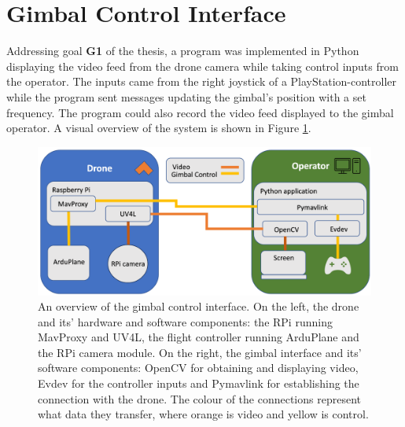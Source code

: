 \documentclass[nofilelist]{cslthse-msc}
\begin{document}
\section{Gimbal Control Interface}
Addressing goal \textbf{G1} of the thesis, a program was implemented in Python displaying the video feed from the drone camera while taking control inputs from the operator. The inputs came from the right joystick of a PlayStation-controller while the program sent messages updating the gimbal's position with a set frequency. The program could also record the video feed displayed to the gimbal operator. A visual overview of the system is shown in Figure \ref{fig:system-overview}.
\begin{figure}[!hbt]
   \centering
   \includegraphics[scale=0.25]{images/system-overview.png} 
   \caption{An overview of the gimbal control interface. On the left, the drone and its' hardware and software components: the RPi running MavProxy and UV4L, the flight controller running ArduPlane and the RPi camera module. On the right, the gimbal interface and its' software components: OpenCV for obtaining and displaying video, Evdev for the controller inputs and Pymavlink for establishing the connection with the drone. The colour of the connections represent what data they transfer, where orange is video and yellow is control.}
   \label{fig:system-overview}
\end{figure}
\end{document}

